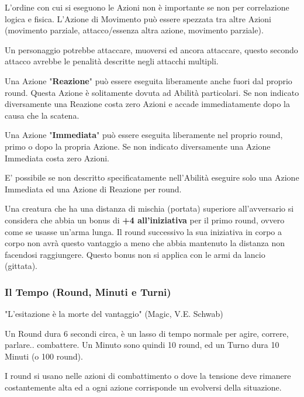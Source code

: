 \documentclass[a4paper,11pt,twoside,openany]{book}
\begin{document}
\bigskip

L'ordine con cui si eseguono le Azioni non è importante se non per correlazione logica e fisica. L'Azione di Movimento può essere spezzata tra altre Azioni (movimento parziale, attacco/essenza altra azione, movimento parziale).

Un personaggio potrebbe attaccare, muoversi ed ancora attaccare, questo secondo attacco avrebbe le penalità descritte negli attacchi multipli.
\smallskip

Una Azione "\textbf{Reazione}" può essere eseguita liberamente anche fuori dal proprio round. Questa Azione è solitamente dovuta ad Abilità particolari. Se non indicato diversamente una Reazione costa zero Azioni e accade immediatamente dopo la causa che la scatena.

\smallskip

Una Azione "\textbf{Immediata}" può essere eseguita liberamente nel proprio round, primo o dopo la propria Azione. Se non indicato diversamente una Azione Immediata costa zero Azioni.

E' possibile se non descritto specificatamente nell'Abilità eseguire solo una Azione Immediata ed una Azione di Reazione per round.

Una creatura che ha una distanza di mischia (portata) superiore all'avversario si considera che abbia un bonus di \textbf{+4 all'iniziativa} per il primo round, ovvero come se usasse un'arma lunga. Il round successivo la sua iniziativa in corpo a corpo non avrà questo vantaggio a meno che abbia mantenuto la distanza non facendosi raggiungere.
Questo bonus non si applica con le armi da lancio (gittata).

\subsubsection{Il Tempo (Round, Minuti e Turni)}

\label{il-tempo-round-minuti-e-turni}
\begin{tcolorbox}[enhanced,arc=5pt,boxrule=0.3pt]{
		"L'esitazione è la morte del vantaggio" (Magic, V.E. Schwab)}\end{tcolorbox}\medskip

Un Round dura 6 secondi circa, è un lasso di tempo normale per agire, correre, parlare.. combattere. Un Minuto sono quindi 10 round, ed un Turno dura 10 Minuti (o 100 round).

I round si usano nelle azioni di combattimento o dove la tensione deve rimanere costantemente alta ed a ogni azione corrisponde un evolversi della situazione.
\end{document}

